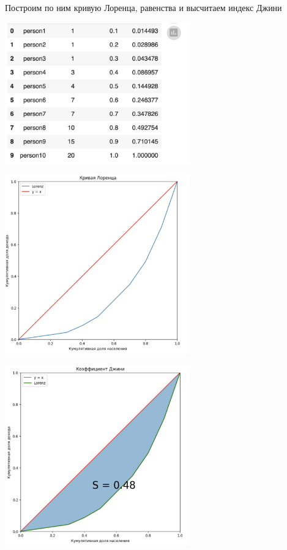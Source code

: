 \documentclass{article}
\begin{document}
\begin{itemize}
    Построим по ним кривую Лоренца, равенства и высчитаем индекс Джини


    \begin{center}
        \includegraphics[width=0.6\textwidth]{pics/stolb.png}
    \end{center} 


    \begin{center}
        \includegraphics[width=0.6\textwidth]{pics/graph.png}
    \end{center} 

    \begin{center}
        \includegraphics[width=0.6\textwidth]{pics/gini.png}
    \end{center} 


\end{itemize}
\end{document}

